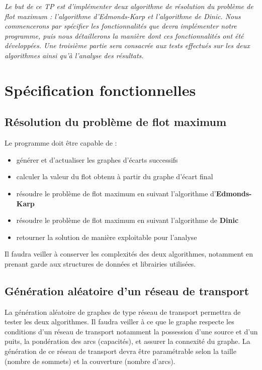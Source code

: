 \textit{Le but de ce TP est d'implémenter deux algorithme de résolution du problème de flot maximum : l'algorithme d'Edmonds-Karp et l'algorithme de Dinic. Nous commencerons par spécifier les fonctionnalités que devra implémenter notre programme, puis nous détaillerons la manière dont ces fonctionnalités ont été développées. Une troisième partie sera consacrée aux tests effectués sur les deux algorithmes ainsi qu'à l'analyse des résultats.}

\section{Spécification fonctionnelles}

\subsection{Résolution du problème de flot maximum}

Le programme doit être capable de :
\begin{itemize}
\item générer et d'actualiser les graphes d'écarts successifs
\item calculer la valeur du flot obtenu à partir du graphe d'écart final
\item résoudre le problème de flot maximum en suivant l'algorithme d'\textbf{Edmonds-Karp}
\item résoudre le problème de flot maximum en suivant l'algorithme de \textbf{Dinic}
\item retourner la solution de manière exploitable pour l'analyse
\end{itemize}

Il faudra veiller à conserver les complexités des deux algorithmes, notamment en prenant garde aux structures de données et librairies utilisées.

\subsection{Génération aléatoire d'un réseau de transport}

La génération aléatoire de graphes de type réseau de transport permettra de tester les deux algorithmes. Il faudra veiller à ce que le graphe respecte les conditions d'un réseau de transport notamment la possession d'une source et d'un puits, la pondération des arcs (capacités), et assurer la connexité du graphe. La génération de ce réseau de transport devra être paramétrable selon la taille (nombre de sommets) et la couverture (nombre d'arcs).

